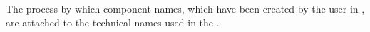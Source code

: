 \item[Object mapping]{
The process by which component names, 
which have been created by the user in \gdsteps, are attached to the technical names used in the \gdaut{}.
}

